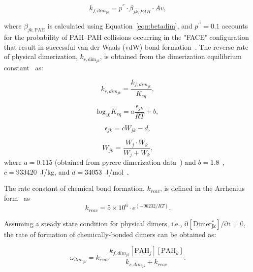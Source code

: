 \begin{equation}
	k_{f,dim_{jk}}=
	p^{''}\cdot\beta_{jk,PAH}\cdot Av
	\label{eqn:kfphydim_reacdim},
\end{equation}

\noindent where $\beta_{jk,\mathrm{PAH}}$ is calculated using Equation~\eqref{eqn:betadim}, and $p^{\prime\prime} = 0.1$ accounts for the probability of PAH–PAH collisions occurring in the "FACE" configuration that result in successful van der Waals (vdW) bond formation~\citep{miller1984intermolecular}. The reverse rate of physical dimerization, $k_{r,\mathrm{dim}_{jk}}$, is obtained from the dimerization equilibrium constant~\citep{miller1991kinetics} as:


\begin{equation}
	k_{r,dim_{jk}} = \frac{k_{f,dim_{jk}}}{K_{eq}} 
	\label{eqn:krphydim_reacdim},
\end{equation}

\begin{equation}
	\mathrm{log}_{10}K_{eq}=
	a\frac{\epsilon_{jk}}{RT}+b
	\label{eqn:keq_reacdim},
\end{equation}

\begin{equation}
	\epsilon_{jk} = cW_{jk} -d
	\label{eqn:epsilon_reacdim},
\end{equation}

\begin{equation}
	W_{jk} = \frac{W_j\cdot W_k}{W_j+W_k}
	\label{eqn:Wjk_reacdim},
\end{equation}
\noindent where $a=0.115$ (obtained from pyrere dimerization data~\citep{sabbah2010exploring}) and $b=1.8$~\citep{kholghy2018reactive}, $c=933420$~J/kg, and $d=34053$~J/mol~\cite{kholghy2018reactive}. 

The rate constant of chemical bond formation, $k_{reac}$, is defined in the Arrhenius form~\cite{naseri2022simulating} as
\begin{equation}
	k_{reac} = 5\times10^6\cdot e^{(-96232/RT)}
	\label{eqn:kc_reacdim}.
\end{equation}

Assuming a steady state condition for physical dimers, i.e., $\mathrm{\partial [Dimer^*_{jk}]/\partial t=0}$, the rate of formation of chemically-bonded dimers can be obtained as:

\begin{equation}
	\omega_{dim_{jk}} = k_{reac}\frac{k_{f,dim_{jk}}[\mathrm{PAH}_j][\mathrm{PAH}_k]}
	{k_{r,dim_{jk}}+k_{reac}}
	\label{eqn:chemdimer_reacdim}.
\end{equation}

